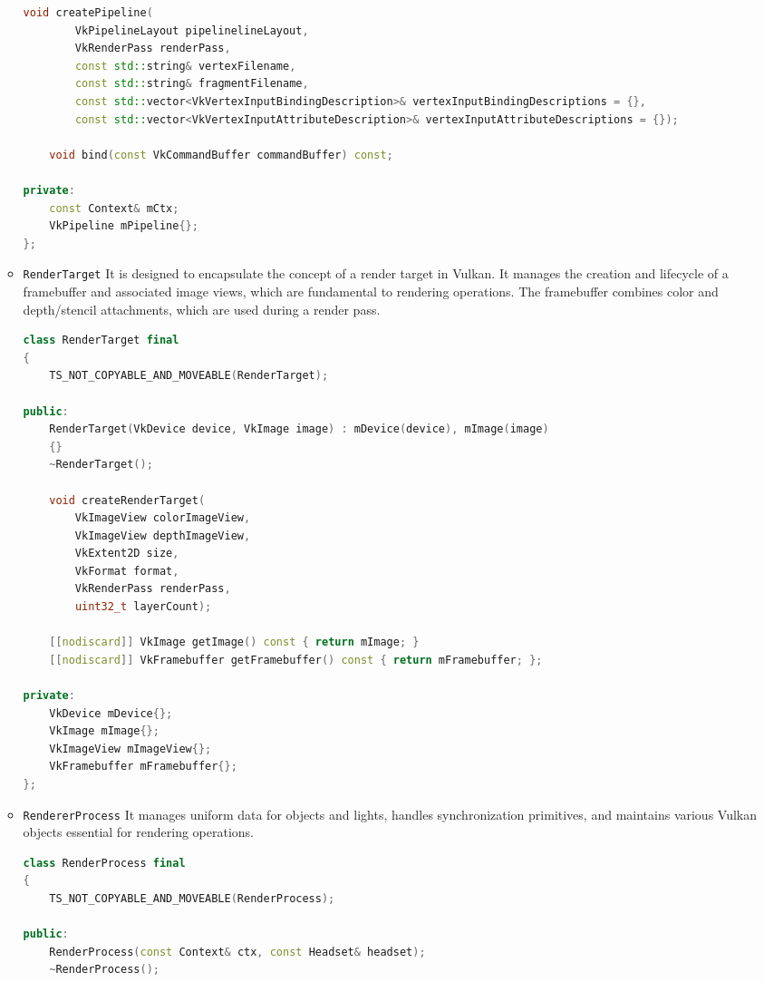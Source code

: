 \begin{itemize}
\begin{itemize}
\begin{lstlisting}[language=c++, caption=\texttt{Pipeline} class (./engine/src/core/pipeline.h)]
    void createPipeline(
        VkPipelineLayout pipelinelineLayout,
        VkRenderPass renderPass,
        const std::string& vertexFilename,
        const std::string& fragmentFilename,
        const std::vector<VkVertexInputBindingDescription>& vertexInputBindingDescriptions = {},
        const std::vector<VkVertexInputAttributeDescription>& vertexInputAttributeDescriptions = {});

    void bind(const VkCommandBuffer commandBuffer) const;

private:
    const Context& mCtx;
    VkPipeline mPipeline{};
};
\end{lstlisting}
    \item \texttt{RenderTarget}
    It is designed to encapsulate the concept of a render target in Vulkan. It manages the creation and lifecycle of a framebuffer and associated image views, which are fundamental to rendering operations. The framebuffer combines color and depth/stencil attachments, which are used during a render pass.
\begin{lstlisting}[language=c++, caption=\texttt{RenderTarget} class (./engine/src/core/render\_target.h)]
class RenderTarget final
{
    TS_NOT_COPYABLE_AND_MOVEABLE(RenderTarget);

public:
    RenderTarget(VkDevice device, VkImage image) : mDevice(device), mImage(image)
    {}
    ~RenderTarget();

    void createRenderTarget(
        VkImageView colorImageView,
        VkImageView depthImageView,
        VkExtent2D size,
        VkFormat format,
        VkRenderPass renderPass,
        uint32_t layerCount);

    [[nodiscard]] VkImage getImage() const { return mImage; }
    [[nodiscard]] VkFramebuffer getFramebuffer() const { return mFramebuffer; };

private:
    VkDevice mDevice{};
    VkImage mImage{};
    VkImageView mImageView{};
    VkFramebuffer mFramebuffer{};
};
\end{lstlisting}
    \item \texttt{RendererProcess}
    It manages uniform data for objects and lights, handles synchronization primitives, and maintains various Vulkan objects essential for rendering operations.
\begin{lstlisting}[language=c++, caption=\texttt{RendererProcess} class (./engine/src/core/renderer\_process.h)]
class RenderProcess final
{
    TS_NOT_COPYABLE_AND_MOVEABLE(RenderProcess);

public:
    RenderProcess(const Context& ctx, const Headset& headset);
    ~RenderProcess();


\end{lstlisting}
\end{itemize}
\end{itemize}
